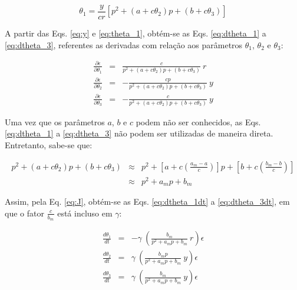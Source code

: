 \begin{equation}\label{eq:theta_1}
\theta_1 = \frac{y}{cr}\left[ p^2 + (a + c\theta_2)p + (b + c\theta_3) \right]
\end{equation}

A partir das Eqs. \ref{eq:y} e \ref{eq:theta_1}, obtém-se as Eqs.
\ref{eq:dtheta_1} a \ref{eq:dtheta_3}, referentes as derivadas com relação aos
parâmetros $\theta_1$, $\theta_2$ e $\theta_3$:

\begin{eqnarray}
\frac{\partial \epsilon}{\partial \theta_1} & = &
    \frac{c}{p^2 + (a + c\theta_2)p + (b + c\theta_3)}\ r 
    \label{eq:dtheta_1}\\
\frac{\partial \epsilon}{\partial \theta_2} & = &
    -\frac{cp}{p^2 + (a + c\theta_2)p + (b + c\theta_3)}\ y 
    \label{eq:dtheta_2}\\
\frac{\partial \epsilon}{\partial \theta_3} & = &
    -\frac{c}{p^2 + (a + c\theta_2)p + (b + c\theta_3)}\ y 
    \label{eq:dtheta_3}
\end{eqnarray}

Uma vez que os parâmetros $a$, $b$ e $c$ podem não ser conhecidos, as Eqs.
\ref{eq:dtheta_1} a \ref{eq:dtheta_3} não podem ser utilizadas de maneira
direta. Entretanto, sabe-se que:

\begin{eqnarray}
p^2 + (a + c\theta_2)p + (b + c\theta_3) & \approx & 
p^2 + 
\left[a + c\left( \frac{a_m - a}{c} \right)\right]p + 
\left[b + c\left( \frac{b_m - b}{c} \right)\right] \nonumber\\ 
 & \approx & p^2 + a_mp + b_m \nonumber
\end{eqnarray}

Assim, pela Eq. \ref{eq:J}, obtém-se as Eqs. \ref{eq:dtheta_1dt} a
\ref{eq:dtheta_3dt}, em que o fator $\frac{c}{b_m}$ está incluso em $\gamma$:

\begin{eqnarray}
\frac{d\theta_1}{dt} & = & -\gamma\ \left(\frac{b_m}
                                             {p^2 + a_mp + b_m}\ r
                                  \right)\epsilon \label{eq:dtheta_1dt}\\
\frac{d\theta_2}{dt} & = & \gamma\ \left(\frac{b_m p}
                                            {p^2 + a_mp + b_m}\ y
                                 \right)\epsilon \label{eq:dtheta_2dt}\\
\frac{d\theta_3}{dt} & = & \gamma\ \left(\frac{b_m}
                                          {p^2 + a_mp + b_m}\ y
                               \right)\epsilon \label{eq:dtheta_3dt}
\end{eqnarray}

